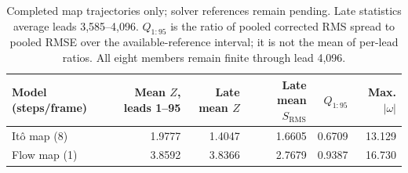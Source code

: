 \begin{table}[t]
\centering
\caption{Completed map trajectories only; solver references remain pending. Late statistics average leads 3,585--4,096. $Q_{1:95}$ is the ratio of pooled corrected RMS spread to pooled RMSE over the available-reference interval; it is not the mean of per-lead ratios. All eight members remain finite through lead 4,096.}
\label{tab:long-maps}
\small
\setlength{\tabcolsep}{4pt}
\begin{tabular}{lrrrrr}
\toprule
Model (steps/frame) & Mean $Z$, leads 1--95 & Late mean $Z$ & Late mean $S_{\mathrm{RMS}}$ & $Q_{1:95}$ & Max. $|\omega|$ \\
\midrule
It\^o map (8) & 1.9777 & 1.4047 & 1.6605 & 0.6709 & 13.129 \\
Flow map (1) & 3.8592 & 3.8366 & 2.7679 & 0.9387 & 16.730 \\
\bottomrule
\end{tabular}
\end{table}
